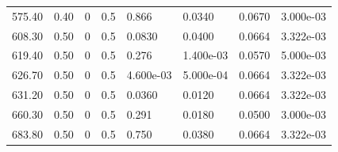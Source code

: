 \documentclass[preview]{standalone}
\begin{document}
{{\begin{tabular}{L{1.2cm}C{1.2cm} C{0.3cm}C{0.5cm} C{1.4cm}C{1.4cm} C{1.4cm}C{1.4cm}}
  575.40  &  0.40  & 0     & 0.5 &  0.866  & 0.0340  & 0.0670 &  3.000e-03   \\ 
  608.30  &  0.50  & 0     & 0.5 &  0.0830  & 0.0400  & 0.0664 &  3.322e-03   \\ 
  619.40  &  0.50  & 0     & 0.5 &  0.276  & 1.400e-03  & 0.0570 &  5.000e-03   \\ 
  626.70  &  0.50  & 0     & 0.5 &  4.600e-03  & 5.000e-04  & 0.0664 &  3.322e-03   \\ 
  631.20  &  0.50  & 0     & 0.5 &  0.0360  & 0.0120  & 0.0664 &  3.322e-03   \\ 
  660.30  &  0.50  & 0     & 0.5 &  0.291  & 0.0180  & 0.0500 &  3.000e-03   \\ 
  683.80  &  0.50  & 0     & 0.5 &  0.750  & 0.0380  & 0.0664 &  3.322e-03   \\ 
\hline 
\end{tabular} 

}}
\end{document}
